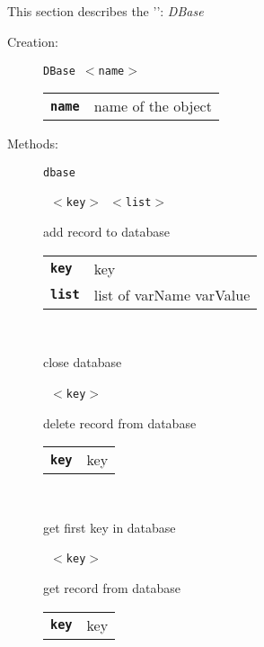 
\subsection{}

This section describes the '': \textsl{DBase}

\begin{description}

  \item[Creation:] \texttt{DBase  $<$name$>$}


      \begin{tabular}{ll}
 \texttt{\textbf{name}} &    name of the object \\
      \end{tabular}

\vspace{3mm} \item[Methods:] \texttt{dbase}

    \begin{description}
       \texttt{ $<$key$>$ $<$list$>$} \

        add record to database

      \begin{tabular}{ll}
 \texttt{\textbf{key}} &   key  \\
 \texttt{\textbf{list}} &  list of {varName varValue}  \\
      \end{tabular}
       \texttt{} \

        close database

       \texttt{ $<$key$>$} \

        delete record from database

      \begin{tabular}{ll}
 \texttt{\textbf{key}} &  key  \\
      \end{tabular}
       \texttt{} \

        get first key in database

       \texttt{ $<$key$>$} \

        get record from database

      \begin{tabular}{ll}
 \texttt{\textbf{key}} &  key  \\
      \end{tabular}
       \texttt{} \


\end{description}
\end{description}
